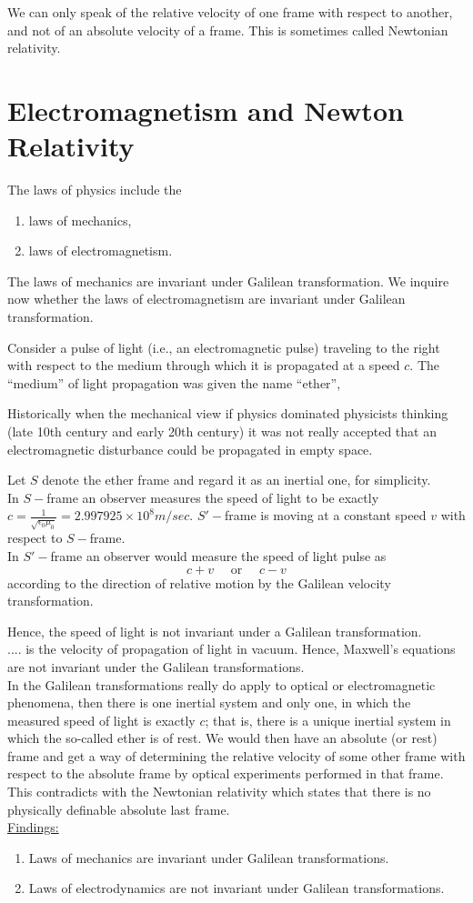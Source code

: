 \documentclass[../main-sheet.tex]{subfiles}
\begin{document}
We can only speak of the relative velocity of one frame with respect to another, and not of an absolute velocity of a frame. This is sometimes called Newtonian relativity.
\section{Electromagnetism and Newton Relativity}
The laws of physics include the
\begin{enumerate}[label=(\roman*)]
    \item laws of mechanics,
    \item laws of electromagnetism.
\end{enumerate}
The laws of mechanics are invariant under Galilean transformation. We inquire now whether the laws of electromagnetism are invariant under Galilean transformation.

Consider a pulse of light (i.e., an electromagnetic pulse) traveling to the right with respect to the medium through which it is propagated at a speed \(c \). The ``medium'' of light propagation was given the name ``ether'',

Historically when the mechanical view if physics dominated physicists thinking (late 10th century and early 20th century) it was not really accepted that an electromagnetic disturbance could be propagated in empty space.

Let \(S \) denote the ether frame and regard it as an inertial one, for simplicity.\\
In \(S-\)frame an observer measures the speed of light to be exactly \(c=\frac{1}{\sqrt{\epsilon_0\mu_0}}=2.997925\times10^{8}m/sec\). \(S'-\)frame is moving at a constant speed \(v \) with respect to \(S-\)frame.\\
In \(S'-\)frame an observer would measure the speed of light pulse as 
\[c+v\quad \text{ or }\quad c-v\]
according to the direction of relative motion by the Galilean velocity transformation.

Hence, the speed of light is not invariant under a Galilean transformation.\\

.... is the velocity of propagation of light in vacuum. Hence, Maxwell's equations are not invariant under the Galilean transformations.\\

In the Galilean transformations really do apply to optical or electromagnetic phenomena, then there is one inertial system and only one, in which the measured speed of light is exactly \(c \); that is, there is a unique inertial system in which the so-called ether is of rest. We would then have an absolute (or rest) frame and get a way of determining the relative velocity of some other frame with respect to the absolute frame by optical experiments performed in that frame. This contradicts with the Newtonian relativity which states that there is no physically definable absolute last frame.\\

\underline{Findings:}
\begin{enumerate}
    \item Laws of mechanics are invariant under Galilean transformations.
    \item Laws of electrodynamics are not invariant under Galilean transformations.
\end{enumerate}
\end{document}
